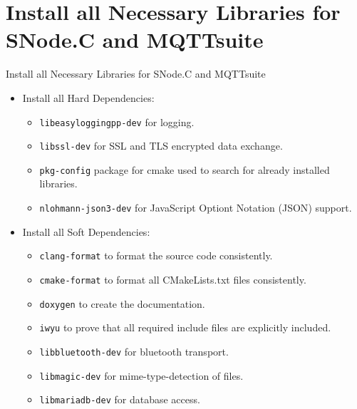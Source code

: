 \nosectionpage
\section{Install all Necessary Libraries for SNode.C and MQTTsuite}
\withsectionpage

\begin{frame}{Install all Necessary Libraries for SNode.C and MQTTsuite}
  \begin{itemize}
    \item Install all \alert{Hard Dependencies}:
    \begin{itemize}
      \item \texttt{\alert{libeasyloggingpp-dev}} for logging.
      \item \texttt{\alert{libssl-dev}} for SSL and TLS encrypted data exchange.
      \item \texttt{\alert{pkg-config}} package for cmake used to search for already installed libraries.
      \item \texttt{\alert{nlohmann-json3-dev}} for \alert{J}ava\alert{S}cript \alert{O}ptiont \alert{N}otation (\alert{JSON}) support.
    \end{itemize}
    \item Install all \alert{Soft Dependencies}:
    \begin{itemize}
      \item \texttt{\alert{clang-format}} to format the source code consistently.
      \item \texttt{\alert{cmake-format}} to format all CMakeLists.txt files consistently.
      \item \texttt{\alert{doxygen}} to create the documentation.
      \item \texttt{\alert{iwyu}} to prove that all required include files are explicitly included.
      \item \texttt{\alert{libbluetooth-dev}} for bluetooth transport.
      \item \texttt{\alert{libmagic-dev}} for mime-type-detection of files.
      \item \texttt{\alert{libmariadb-dev}} for database access.
    \end{itemize}
  \end{itemize}
\end{frame}
